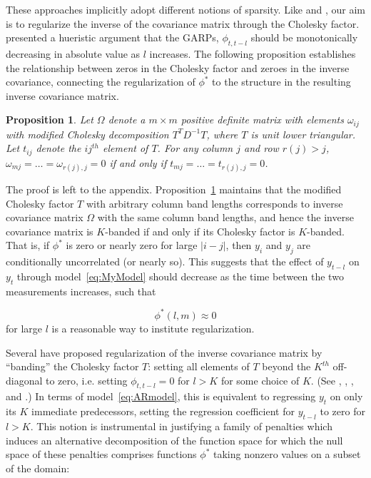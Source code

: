 \documentclass[12pt]{article}
\newtheorem{proposition}[theorem]{Proposition}
\theoremstyle{definition}
\begin{document}
These approaches implicitly adopt different notions of sparsity. Like \citet{huang2006covariance} and \citet{levina2008sparse}, our aim is to regularize the inverse of the covariance matrix through the Cholesky factor.\cite{pourahmadi1999joint} presented a hueristic argument that the GARPs, $\phi_{t,t-l}$ should be monotonically decreasing in absolute value as $l$ increases. The following proposition establishes the relationship between zeros in the Cholesky factor and zeroes in the inverse covariance, connecting the regularization of $\phi^*$  to the structure in the resulting inverse covariance matrix. 

\begin{proposition} \label{prop:cholesky-inverse-banding-equivalence}
Let $\Omega$ denote a $m \times m$ positive definite matrix with elements $\omega_{ij}$ with modified Cholesky decomposition $T^T D^{-1} T$, where $T$ is unit lower triangular. Let  $t_{ij}$ denote the $ij^{th}$ element of $T$. For any column $j$ and row $r\left(j\right) > j$,  $\omega_{mj} = \dots = \omega_{r\left(j\right),j} = 0$ if and only if  $t_{mj} = \dots = t_{r\left(j\right),j} = 0$.
\end{proposition}


The proof is left to the appendix. Proposition~\ref{prop:cholesky-inverse-banding-equivalence} maintains that the modified Cholesky factor $T$ with arbitrary column band lengths corresponds to inverse covariance matrix $\Omega$ with the same column band lengths, and hence the inverse covariance matrix is $K$-banded if and only if its Cholesky factor is $K$-banded. That is, if $\phi^*$ is zero or nearly zero for  large $\vert i-j \vert$, then $y_i$ and $y_j$ are conditionally uncorrelated (or nearly so). This suggests that the effect of $y_{t-l}$ on $y_t$ through model~\ref{eq:MyModel} should decrease as the time between the two measurements increases, such that
 
\[
\phi^*\left(l,m\right) \approx 0
\]
\noindent
for large $l$ is a reasonable way to institute regularization. 

Several have proposed regularization of the inverse covariance matrix by ``banding'' the Cholesky factor $T$: setting all elements of $T$ beyond the $K^{th}$ off-diagonal to zero, i.e. setting $\phi_{t,t-l}=0$ for $l > K$ for some choice of $K$.  (See \cite{pourahmadi1999joint}, \citet{wu2003nonparametric}, \cite{bickel2008regularized}, and \cite{huang2007estimation}.) In terms of model~\ref{eq:ARmodel}, this is equivalent to regressing $y_t$  on only its $K$ immediate predecessors, setting the regression coefficient for $y_{t-l}$ to zero for $l>K$.  This notion is instrumental in justifying a family of penalties which induces an alternative decomposition of the function space for which the null space of these penalties comprises functions $\phi^*$ taking nonzero values on a subset of the domain:
\end{document}
